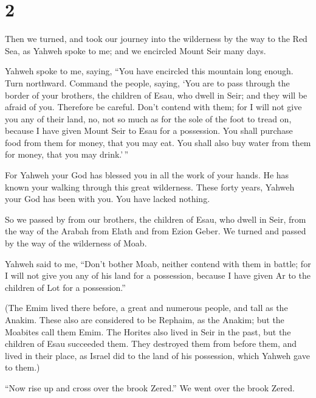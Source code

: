 \hypertarget{section-1}{%
\section{2}\label{section-1}}

 Then we turned, and took our journey into the wilderness
by the way to the Red Sea, as Yahweh spoke to me; and we encircled Mount
Seir many days.

 Yahweh spoke to me, saying,  ``You have
encircled this mountain long enough. Turn northward. 
Command the people, saying, `You are to pass through the border of your
brothers, the children of Esau, who dwell in Seir; and they will be
afraid of you. Therefore be careful.  Don't contend with
them; for I will not give you any of their land, no, not so much as for
the sole of the foot to tread on, because I have given Mount Seir to
Esau for a possession.  You shall purchase food from them
for money, that you may eat. You shall also buy water from them for
money, that you may drink.'\,''

 For Yahweh your God has blessed you in all the work of
your hands. He has known your walking through this great wilderness.
These forty years, Yahweh your God has been with you. You have lacked
nothing.

 So we passed by from our brothers, the children of Esau,
who dwell in Seir, from the way of the Arabah from Elath and from Ezion
Geber. We turned and passed by the way of the wilderness of Moab.

 Yahweh said to me, ``Don't bother Moab, neither contend
with them in battle; for I will not give you any of his land for a
possession, because I have given Ar to the children of Lot for a
possession.''

 (The Emim lived there before, a great and numerous
people, and tall as the Anakim.  These also are
considered to be Rephaim, as the Anakim; but the Moabites call them
Emim.  The Horites also lived in Seir in the past, but
the children of Esau succeeded them. They destroyed them from before
them, and lived in their place, as Israel did to the land of his
possession, which Yahweh gave to them.)

 ``Now rise up and cross over the brook Zered.'' We went
over the brook Zered.


